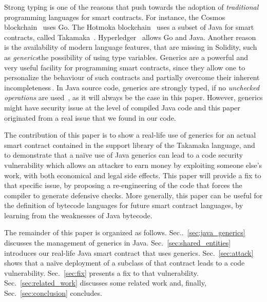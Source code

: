 Strong typing is one of the reasons that push towards the adoption
of \emph{traditional} programming languages for smart contracts. For instance,
the Cosmos blockchain~\cite{cosmos} uses Go. The
Hotmoka blockchain~\cite{hotmoka} uses a subset of Java
for smart contracts, called Takamaka~\cite{Spoto19,Spoto20}.
Hyperledger~\cite{hyperldeger} allows Go and Java.
Another reason is the availability of modern
language features, that are missing in Solidity,
such as \emph{generics}\ie the possibility of using
type variables. Generics are a powerful and very useful facility for programming
smart contracts, since they allow one to personalize the behaviour of such contracts and partially overcome their inherent incompleteness\,\cite{ebp}. In Java source code, generics are strongly typed, if no \emph{unchecked operations}
are used~\cite{NaftalinW06}, as it will always be the case in this paper.
However, generics might have security issue at the level of compiled Java code and this paper originated from a
real issue that we found in our code.




The contribution of this paper is to show a real-life
use of generics for an actual smart contract contained in the support
library of the Takamaka language, and to demonstrate that a na\"{i}ve use
of Java generics can lead to a code security vulnerability which
allows an attacker to earn money by exploiting someone else's work, with both economical and legal side effects.
This paper will provide a fix to that specific issue,
by proposing a re-engineering of the code that forces the compiler to generate defensive checks.
More generally, this paper can be useful for the definition of
bytecode languages for future smart contract languages, by
learning from the weaknesses of Java bytecode.

The remainder of this paper is organized as follows.
Sec..~\ref{sec:java_generics} discusses the management of generics in Java.
Sec.~\ref{sec:shared_entities} introduces our real-life Java smart
contract that uses generics. Sec.~\ref{sec:attack} shows that a na\"{i}ve
deployment of a subclass of that contract leads to a code vulnerability.
Sec.~\ref{sec:fix} presents a fix to that vulnerability.
Sec.~\ref{sec:related_work} discusses some related work and, finally,
Sec.~\ref{sec:conclusion} concludes.

